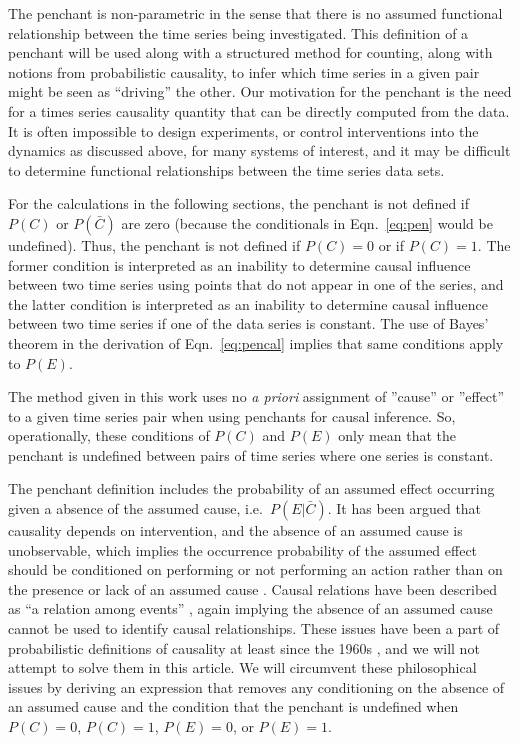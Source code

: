 \documentclass[twocolumn,aps,pre,groupedaddress]{revtex4-1}
\begin{document}
The penchant is non-parametric in the sense that there is no assumed functional relationship between the time series being investigated.  This definition of a penchant will be used along with a structured method for counting, along with notions from probabilistic causality, to infer which time series in a given pair might be seen as ``driving'' the other.  Our motivation for the penchant is the need for a times series causality quantity that can be directly computed from the data.  It is often impossible to design experiments, or control interventions into the dynamics as discussed above, for many systems of interest, and it may be difficult to determine functional relationships between the time series data sets.

For the calculations in the following sections, the penchant is not defined if $P(C)$ or $P(\bar{C})$ are zero (because the conditionals in Eqn.\ \ref{eq:pen} would be undefined).  Thus, the penchant is not defined if $P(C)=0$ or if $P(C)=1$.  The former condition is interpreted as an inability to determine causal influence between two time series using points that do not appear in one of the series, and the latter condition is interpreted as an inability to determine causal influence between two time series if one of the data series is constant.  The use of Bayes' theorem in the derivation of Eqn.\ \ref{eq:pencal} implies that same conditions apply to $P(E)$.

The method given in this work uses no {\em a priori} assignment of ''cause'' or ''effect'' to a given time series pair when using penchants for causal inference.  So, operationally, these conditions of $P(C)$ and $P(E)$ only mean that the penchant is undefined between pairs of time series where one series is constant. 

The penchant definition includes the probability of an assumed effect occurring given a absence of the assumed cause, i.e.\ $P(E|\bar{C})$.  It has been argued that causality depends on intervention, and the absence of an assumed cause is unobservable, which implies the occurrence probability of the assumed effect should be conditioned on performing or not performing an action rather than on the presence or lack of an assumed cause \cite{Pearl2000}.  Causal relations have been described as ``a relation among events'' \cite{Bunge1979}, again implying the absence of an assumed cause cannot be used to identify causal relationships.  These issues have been a part of probabilistic definitions of causality at least since the 1960s \cite{Suppes1970}, and we will not attempt to solve them in this article.  We will circumvent these philosophical issues by deriving an expression that removes any conditioning on the absence of an assumed cause and the condition that the penchant is undefined when $P(C)=0$, $P(C)=1$, $P(E)=0$, or $P(E)=1$. 
\end{document}
